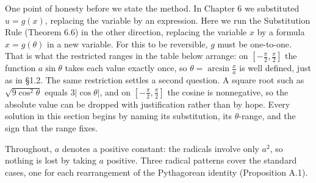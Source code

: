 \documentclass[a4paper,12pt,oneside]{memoir}
\begin{document}
One point of honesty before we state the method. In Chapter 6 we substituted \(u = g(x)\), replacing the variable by an expression. Here we run the Substitution Rule (Theorem 6.6) in the other direction, replacing the variable \(x\) by a formula \(x = g(\theta)\) in a new variable. For this to be reversible, \(g\) must be one-to-one. That is what the restricted ranges in the table below arrange: on \([-\tfrac{\pi}{2}, \tfrac{\pi}{2}]\) the function \(a\sin\theta\) takes each value exactly once, so \(\theta = \arcsin\tfrac{x}{a}\) is well defined, just as in §1.2. The same restriction settles a second question. A square root such as \(\sqrt{9\cos^{2}\theta}\) equals \(3\lvert\cos\theta\rvert\), and on \([-\tfrac{\pi}{2}, \tfrac{\pi}{2}]\) the cosine is nonnegative, so the absolute value can be dropped with justification rather than by hope. Every solution in this section begins by naming its substitution, its \(\theta\)-range, and the sign that the range fixes.

Throughout, \(a\) denotes a positive constant: the radicals involve only \(a^{2}\), so nothing is lost by taking \(a\) positive. Three radical patterns cover the standard cases, one for each rearrangement of the Pythagorean identity (Proposition A.1).
\end{document}
